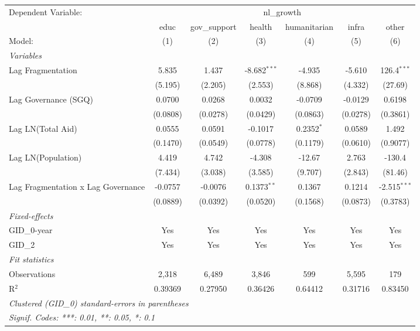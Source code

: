 \begingroup
\centering
\begin{tabular}{lcccccc}
   \tabularnewline \midrule \midrule
   Dependent Variable: & \multicolumn{6}{c}{nl\_growth}\\
                                      & educ     & gov\_support  & health         & humanitarian & infra    & other \\   
   Model:                             & (1)      & (2)           & (3)            & (4)          & (5)      & (6)\\  
   \midrule
   \emph{Variables}\\
   Lag Fragmentation                  & 5.835    & 1.437         & -8.682$^{***}$ & -4.935       & -5.610   & 126.4$^{***}$\\   
                                      & (5.195)  & (2.205)       & (2.553)        & (8.868)      & (4.332)  & (27.69)\\   
   Lag Governance (SGQ)               & 0.0700   & 0.0268        & 0.0032         & -0.0709      & -0.0129  & 0.6198\\   
                                      & (0.0808) & (0.0278)      & (0.0429)       & (0.0863)     & (0.0278) & (0.3861)\\   
   Lag LN(Total Aid)                  & 0.0555   & 0.0591        & -0.1017        & 0.2352$^{*}$ & 0.0589   & 1.492\\   
                                      & (0.1470) & (0.0549)      & (0.0778)       & (0.1179)     & (0.0610) & (0.9077)\\   
   Lag LN(Population)                 & 4.419    & 4.742         & -4.308         & -12.67       & 2.763    & -130.4\\   
                                      & (7.434)  & (3.038)       & (3.585)        & (9.707)      & (2.843)  & (81.46)\\   
   Lag Fragmentation x Lag Governance & -0.0757  & -0.0076       & 0.1373$^{**}$  & 0.1367       & 0.1214   & -2.515$^{***}$\\   
                                      & (0.0889) & (0.0392)      & (0.0520)       & (0.1568)     & (0.0873) & (0.3783)\\   
   \midrule
   \emph{Fixed-effects}\\
   GID\_0-year                        & Yes      & Yes           & Yes            & Yes          & Yes      & Yes\\  
   GID\_2                             & Yes      & Yes           & Yes            & Yes          & Yes      & Yes\\  
   \midrule
   \emph{Fit statistics}\\
   Observations                       & 2,318    & 6,489         & 3,846          & 599          & 5,595    & 179\\  
   R$^2$                              & 0.39369  & 0.27950       & 0.36426        & 0.64412      & 0.31716  & 0.83450\\  
   \midrule \midrule
   \multicolumn{7}{l}{\emph{Clustered (GID\_0) standard-errors in parentheses}}\\
   \multicolumn{7}{l}{\emph{Signif. Codes: ***: 0.01, **: 0.05, *: 0.1}}\\
\end{tabular}
